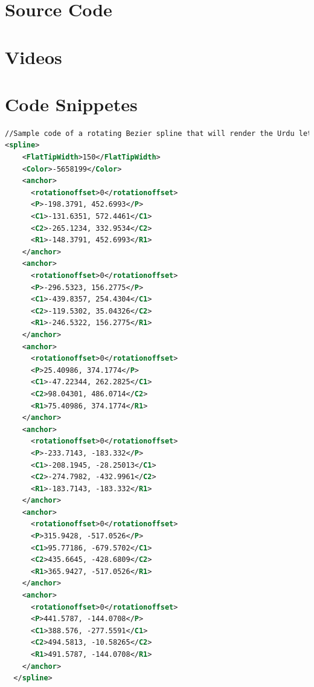 \section{Source Code}\label{Appendix:sourceCode}
{
\clearpage }
\section{Videos}\label{Appendix:sourceCode}
{
\clearpage }
\section{Code Snippetes}
{
\begin{lstlisting}[language=XML]
//Sample code of a rotating Bezier spline that will render the Urdu letter Aa'en in Nastaleeq.
<spline>
    <FlatTipWidth>150</FlatTipWidth>
    <Color>-5658199</Color>
    <anchor>
      <rotationoffset>0</rotationoffset>
      <P>-198.3791, 452.6993</P>
      <C1>-131.6351, 572.4461</C1>
      <C2>-265.1234, 332.9534</C2>
      <R1>-148.3791, 452.6993</R1>
    </anchor>
    <anchor>
      <rotationoffset>0</rotationoffset>
      <P>-296.5323, 156.2775</P>
      <C1>-439.8357, 254.4304</C1>
      <C2>-119.5302, 35.04326</C2>
      <R1>-246.5322, 156.2775</R1>
    </anchor>
    <anchor>
      <rotationoffset>0</rotationoffset>
      <P>25.40986, 374.1774</P>
      <C1>-47.22344, 262.2825</C1>
      <C2>98.04301, 486.0714</C2>
      <R1>75.40986, 374.1774</R1>
    </anchor>
    <anchor>
      <rotationoffset>0</rotationoffset>
      <P>-233.7143, -183.332</P>
      <C1>-208.1945, -28.25013</C1>
      <C2>-274.7982, -432.9961</C2>
      <R1>-183.7143, -183.332</R1>
    </anchor>
    <anchor>
      <rotationoffset>0</rotationoffset>
      <P>315.9428, -517.0526</P>
      <C1>95.77186, -679.5702</C1>
      <C2>435.6645, -428.6809</C2>
      <R1>365.9427, -517.0526</R1>
    </anchor>
    <anchor>
      <rotationoffset>0</rotationoffset>
      <P>441.5787, -144.0708</P>
      <C1>388.576, -277.5591</C1>
      <C2>494.5813, -10.58265</C2>
      <R1>491.5787, -144.0708</R1>
    </anchor>
  </spline>
\end{lstlisting}
}
